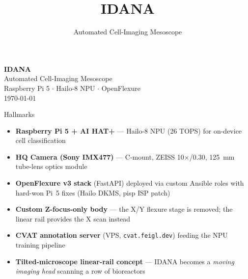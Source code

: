 \documentclass[aspectratio=169,10pt]{beamer}
\title{\textcolor{mesopurple}{IDANA}}
\subtitle{Automated Cell-Imaging Mesoscope}
\author{}
\date{}
\begin{document}
\begin{frame}
  \centering
  \vspace{2cm}
  {\Huge \bfseries \textcolor{mesopurple}{IDANA}\\[0.8cm]}
  {\Large \textcolor{mesogray}{Automated Cell-Imaging Mesoscope}\\[0.4cm]}
  {\normalsize \textcolor{mesogray}{Raspberry Pi 5 $\cdot$ Hailo-8 NPU $\cdot$ OpenFlexure}\\[2.6cm]}
  {\small \textcolor{mesogray}{\today}}
\end{frame}

\begin{frame}[t]{Hallmarks}
  \begin{itemize}
    \item \textbf{Raspberry Pi 5 + AI HAT+} — Hailo-8 NPU (26 TOPS) for on-device
          cell classification
    \item \textbf{HQ Camera (Sony IMX477)} — C-mount, ZEISS 10$\times$/0.30,
          125~mm tube-lens optics module
    \item \textbf{OpenFlexure v3 stack} (FastAPI) deployed via custom Ansible roles
          with hard-won Pi~5 fixes (Hailo DKMS, pisp ISP patch)
    \item \textbf{Custom Z-focus-only body} — the X/Y flexure stage is removed; the
          linear rail provides the X scan instead
    \item \textbf{CVAT annotation server} (VPS, \texttt{cvat.feigl.dev}) feeding the
          NPU training pipeline
    \item \textbf{Tilted-microscope linear-rail concept} — IDANA becomes a
          \emph{moving imaging head} scanning a row of bioreactors
  \end{itemize}
\end{frame}
\end{document}

